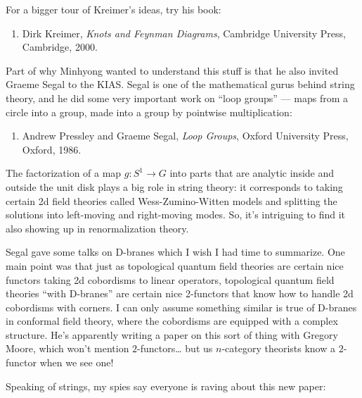 \documentclass{article}
\def\tightlist{}
\renewcommand{\texttt}[1]{%
  \begingroup
  \ttfamily
  \begingroup\lccode`~=`/\lowercase{\endgroup\def~}{/\discretionary{}{}{}}%
  \begingroup\lccode`~=`[\lowercase{\endgroup\def~}{[\discretionary{}{}{}}%
  \begingroup\lccode`~=`.\lowercase{\endgroup\def~}{.\discretionary{}{}{}}%
  \catcode`/=\active\catcode`[=\active\catcode`.=\active
  \scantokens{#1\noexpand}%
  \endgroup
}
\begin{document}
For a bigger tour of Kreimer's ideas, try his book:

\begin{enumerate}
\def\labelenumi{\arabic{enumi})}
\setcounter{enumi}{3}
\tightlist
\item
  Dirk Kreimer, \emph{Knots and Feynman Diagrams}, Cambridge University
  Press, Cambridge, 2000.
\end{enumerate}

Part of why Minhyong wanted to understand this stuff is that he also
invited Graeme Segal to the KIAS. Segal is one of the mathematical gurus
behind string theory, and he did some very important work on ``loop
groups'' --- maps from a circle into a group, made into a group by
pointwise multiplication:

\begin{enumerate}
\def\labelenumi{\arabic{enumi})}
\setcounter{enumi}{4}
\tightlist
\item
  Andrew Pressley and Graeme Segal, \emph{Loop Groups}, Oxford
  University Press, Oxford, 1986.
\end{enumerate}

The factorization of a map \(g\colon S^1 \to G\) into parts that are
analytic inside and outside the unit disk plays a big role in string
theory: it corresponds to taking certain 2d field theories called
Wess-Zumino-Witten models and splitting the solutions into left-moving
and right-moving modes. So, it's intriguing to find it also showing up
in renormalization theory.

Segal gave some talks on D-branes which I wish I had time to summarize.
One main point was that just as topological quantum field theories are
certain nice functors taking 2d cobordisms to linear operators,
topological quantum field theories ``with D-branes'' are certain nice
2-functors that know how to handle 2d cobordisms with corners. I can
only assume something similar is true of D-branes in conformal field
theory, where the cobordisms are equipped with a complex structure. He's
apparently writing a paper on this sort of thing with Gregory Moore,
which won't mention \(2\)-functors\ldots{} but us \(n\)-category
theorists know a \(2\)-functor when we see one!

Speaking of strings, my spies say everyone is raving about this new
paper:

\end{document}
